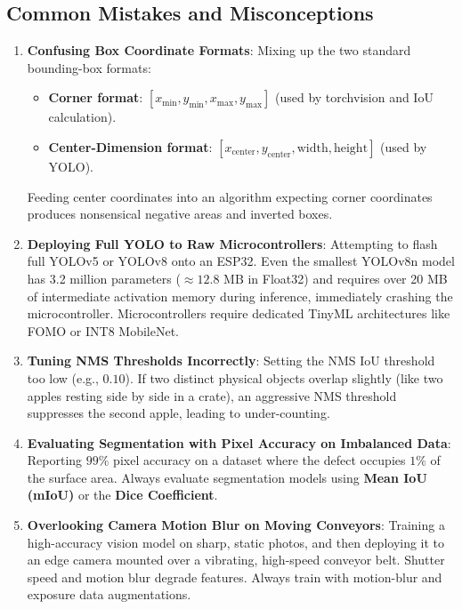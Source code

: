 \subsection{Common Mistakes and Misconceptions}\label{subsec:mistakes}

\begin{warning}
\begin{enumerate}
    \item \textbf{Confusing Box Coordinate Formats}: Mixing up the two standard bounding-box formats:
    \begin{itemize}
        \item \textbf{Corner format}: $[x_{\min}, y_{\min}, x_{\max}, y_{\max}]$ (used by torchvision and IoU calculation).
        \item \textbf{Center-Dimension format}: $[x_{\text{center}}, y_{\text{center}}, \text{width}, \text{height}]$ (used by YOLO).
    \end{itemize}
    Feeding center coordinates into an algorithm expecting corner coordinates produces nonsensical negative areas and inverted boxes.
    \item \textbf{Deploying Full YOLO to Raw Microcontrollers}: Attempting to flash full YOLOv5 or YOLOv8 onto an ESP32. Even the smallest YOLOv8n model has 3.2 million parameters ($\approx 12.8\text{ MB}$ in Float32) and requires over 20 MB of intermediate activation memory during inference, immediately crashing the microcontroller. Microcontrollers require dedicated TinyML architectures like FOMO or INT8 MobileNet.
    \item \textbf{Tuning NMS Thresholds Incorrectly}: Setting the NMS IoU threshold too low (e.g., $0.10$). If two distinct physical objects overlap slightly (like two apples resting side by side in a crate), an aggressive NMS threshold suppresses the second apple, leading to under-counting.
    \item \textbf{Evaluating Segmentation with Pixel Accuracy on Imbalanced Data}: Reporting $99\%$ pixel accuracy on a dataset where the defect occupies $1\%$ of the surface area. Always evaluate segmentation models using \textbf{Mean IoU (mIoU)} or the \textbf{Dice Coefficient}.
    \item \textbf{Overlooking Camera Motion Blur on Moving Conveyors}: Training a high-accuracy vision model on sharp, static photos, and then deploying it to an edge camera mounted over a vibrating, high-speed conveyor belt. Shutter speed and motion blur degrade features. Always train with motion-blur and exposure data augmentations.
\end{enumerate}
\end{warning}

